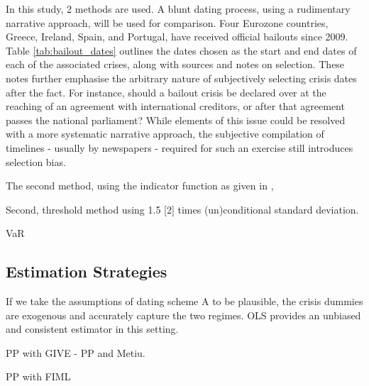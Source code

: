 \documentclass[../base.tex]{subfiles}
\begin{document}
In this study, 2 methods are used. A blunt dating process, using a rudimentary narrative approach, will be used for comparison. Four Eurozone countries, Greece, Ireland, Spain, and Portugal, have received official bailouts since 2009. Table \ref{tab:bailout_dates} outlines the dates chosen as the start and end dates of each of the associated crises, along with sources and notes on selection. These notes further emphasise the arbitrary nature of subjectively selecting crisis dates after the fact. For instance, should a bailout crisis be declared over at the reaching of an agreement with international creditors, or after that agreement passes the national parliament? While elements of this issue could be resolved with a more systematic narrative approach, the subjective compilation of timelines - usually by newspapers - required for such an exercise still introduces selection bias. 

The second method, using the indicator function as given in \cite{pesaran2007econometric}, 

 Second, threshold method using 1.5 [2] times (un)conditional standard deviation. 


\cite{metiu2012sovereign} VaR



\subsection{Estimation Strategies}

If we take the assumptions of dating scheme A to be plausible, the crisis dummies are exogenous and accurately capture the two regimes. OLS provides an unbiased and consistent estimator in this setting. 

PP with GIVE - PP and Metiu.

 
PP with FIML
\cite{massacci2007identification}
\end{document}
